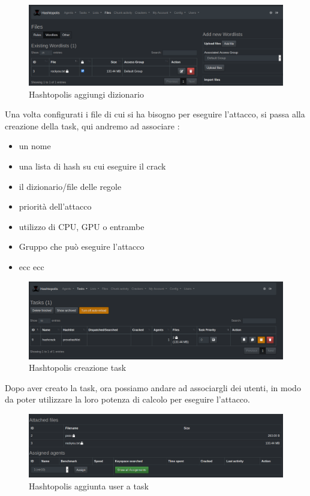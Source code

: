 \begin{figure}[ht]
    \centering
    \includegraphics[width=\linewidth]{Immagini/8/hashtopolis_3.png}
    \caption{Hashtopolis aggiungi dizionario}
\end{figure}

Una volta configurati i file di cui si ha bisogno per eseguire l'attacco, si passa alla creazione della task, qui andremo ad associare :
\begin{itemize}
    \item un nome
    \item una lista di hash su cui eseguire il crack
    \item il dizionario/file delle regole
    \item priorità dell'attacco
    \item utilizzo di CPU, GPU o entrambe
    \item Gruppo che può eseguire l'attacco 
    \item ecc ecc 
\end{itemize}

\begin{figure}[ht]
    \centering
    \includegraphics[width=\linewidth]{Immagini/8/hashtopolis_1.png}
    \caption{Hashtopolis creazione task}
\end{figure}

Dopo aver creato la task, ora possiamo andare ad associargli dei utenti, in modo da poter utilizzare la loro potenza di calcolo per eseguire l'attacco.

\begin{figure}[ht]
    \centering
    \includegraphics[width=\linewidth]{Immagini/8/hashtopolis_4.png}
    \caption{Hashtopolis aggiunta user a task}
\end{figure}

